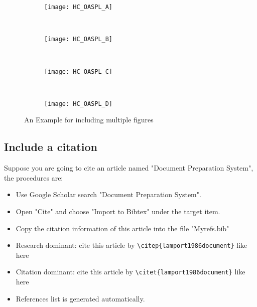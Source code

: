 \begin{figure}[!htbp]
    \centering
    \begin{subfigure}[b]{\MySubFactor\textwidth}
        \texttt{[image: HC\_OASPL\_A]}
        \caption{}
        \label{fig:HC_OASPL_A}
    \end{subfigure}%
    ~%
    \begin{subfigure}[b]{\MySubFactor\textwidth}
        \texttt{[image: HC\_OASPL\_B]}
        \caption{}
        \label{fig:HC_OASPL_B}
    \end{subfigure}%
    \\%
    \begin{subfigure}[b]{\MySubFactor\textwidth}
        \texttt{[image: HC\_OASPL\_C]}
        \caption{}
        \label{fig:HC_OASPL_C}
    \end{subfigure}%
    ~%
    \begin{subfigure}[b]{\MySubFactor\textwidth}
        \texttt{[image: HC\_OASPL\_D]}
        \caption{}
        \label{fig:HC_OASPL_D}
    \end{subfigure}%
    \caption{An Example for including multiple figures}
    \label{fig:HC_OASPL}
\end{figure}

\subsection{Include a citation} %
Suppose you are going to cite an article named "Document Preparation System", the procedures are:
\begin{itemize}
    \item Use Google Scholar search "Document Preparation System".
    \item Open "Cite" and choose "Import to Bibtex" under the target item.
    \item Copy the citation information of this article into the file "Myrefs.bib"
    \item Research dominant: cite this article by \verb+\citep{lamport1986document}+ like here \citep{lamport1986document}
    \item Citation dominant: cite this article by \verb+\citet{lamport1986document}+ like here \citet{lamport1986document}
    \item References list is generated automatically.
\end{itemize}
